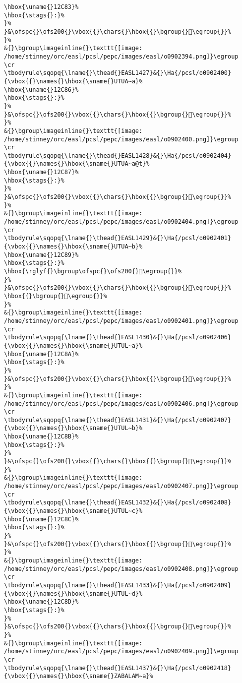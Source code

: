 \begin{verbatim}
\hbox{\uname{}12C83}%
\hbox{\stags{}:}%
}%
}&\ofspc{}\ofs200{}\vbox{{}\chars{}\hbox{{}\bgroup{}𒲃\egroup{}}%
}%
&{}\bgroup\imageinline{}\texttt{[image: /home/stinney/orc/easl/pcsl/pepc/images/easl/o0902394.png]}\egroup
\cr
\tbodyrule\sqopq{\lname{}\thead{}EASL1427}&{}\Ha{/pcsl/o0902400}{\vbox{{}\names{}\hbox{\sname{}UTUA∼a}%
\hbox{\uname{}12C86}%
\hbox{\stags{}:}%
}%
}&\ofspc{}\ofs200{}\vbox{{}\chars{}\hbox{{}\bgroup{}𒲆\egroup{}}%
}%
&{}\bgroup\imageinline{}\texttt{[image: /home/stinney/orc/easl/pcsl/pepc/images/easl/o0902400.png]}\egroup
\cr
\tbodyrule\sqopq{\lname{}\thead{}EASL1428}&{}\Ha{/pcsl/o0902404}{\vbox{{}\names{}\hbox{\sname{}UTUA∼a@t}%
\hbox{\uname{}12C87}%
\hbox{\stags{}:}%
}%
}&\ofspc{}\ofs200{}\vbox{{}\chars{}\hbox{{}\bgroup{}𒲇\egroup{}}%
}%
&{}\bgroup\imageinline{}\texttt{[image: /home/stinney/orc/easl/pcsl/pepc/images/easl/o0902404.png]}\egroup
\cr
\tbodyrule\sqopq{\lname{}\thead{}EASL1429}&{}\Ha{/pcsl/o0902401}{\vbox{{}\names{}\hbox{\sname{}UTUA∼b}%
\hbox{\uname{}12C89}%
\hbox{\stags{}:}%
\hbox{\rglyf{}\bgroup\ofspc{}\ofs200{}𒲉\egroup{}}%
}%
}&\ofspc{}\ofs200{}\vbox{{}\chars{}\hbox{{}\bgroup{}𒲈\egroup{}}%
\hbox{{}\bgroup{}𒲉\egroup{}}%
}%
&{}\bgroup\imageinline{}\texttt{[image: /home/stinney/orc/easl/pcsl/pepc/images/easl/o0902401.png]}\egroup
\cr
\tbodyrule\sqopq{\lname{}\thead{}EASL1430}&{}\Ha{/pcsl/o0902406}{\vbox{{}\names{}\hbox{\sname{}UTUL∼a}%
\hbox{\uname{}12C8A}%
\hbox{\stags{}:}%
}%
}&\ofspc{}\ofs200{}\vbox{{}\chars{}\hbox{{}\bgroup{}𒲊\egroup{}}%
}%
&{}\bgroup\imageinline{}\texttt{[image: /home/stinney/orc/easl/pcsl/pepc/images/easl/o0902406.png]}\egroup
\cr
\tbodyrule\sqopq{\lname{}\thead{}EASL1431}&{}\Ha{/pcsl/o0902407}{\vbox{{}\names{}\hbox{\sname{}UTUL∼b}%
\hbox{\uname{}12C8B}%
\hbox{\stags{}:}%
}%
}&\ofspc{}\ofs200{}\vbox{{}\chars{}\hbox{{}\bgroup{}𒲋\egroup{}}%
}%
&{}\bgroup\imageinline{}\texttt{[image: /home/stinney/orc/easl/pcsl/pepc/images/easl/o0902407.png]}\egroup
\cr
\tbodyrule\sqopq{\lname{}\thead{}EASL1432}&{}\Ha{/pcsl/o0902408}{\vbox{{}\names{}\hbox{\sname{}UTUL∼c}%
\hbox{\uname{}12C8C}%
\hbox{\stags{}:}%
}%
}&\ofspc{}\ofs200{}\vbox{{}\chars{}\hbox{{}\bgroup{}𒲌\egroup{}}%
}%
&{}\bgroup\imageinline{}\texttt{[image: /home/stinney/orc/easl/pcsl/pepc/images/easl/o0902408.png]}\egroup
\cr
\tbodyrule\sqopq{\lname{}\thead{}EASL1433}&{}\Ha{/pcsl/o0902409}{\vbox{{}\names{}\hbox{\sname{}UTUL∼d}%
\hbox{\uname{}12C8D}%
\hbox{\stags{}:}%
}%
}&\ofspc{}\ofs200{}\vbox{{}\chars{}\hbox{{}\bgroup{}𒲍\egroup{}}%
}%
&{}\bgroup\imageinline{}\texttt{[image: /home/stinney/orc/easl/pcsl/pepc/images/easl/o0902409.png]}\egroup
\cr
\tbodyrule\sqopq{\lname{}\thead{}EASL1437}&{}\Ha{/pcsl/o0902418}{\vbox{{}\names{}\hbox{\sname{}ZABALAM∼a}%

\end{verbatim}
